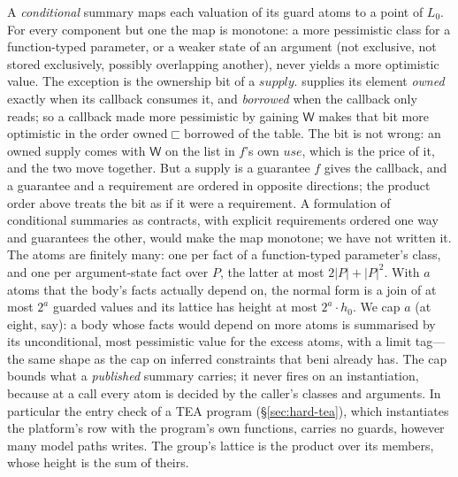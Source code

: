 A \emph{conditional} summary maps each valuation of its guard atoms to a point of $L_0$. For every
component but one the map is monotone: a more pessimistic class for a function-typed parameter, or a
weaker state of an argument (not exclusive, not stored exclusively, possibly overlapping another), never
yields a more optimistic value. The exception is the ownership bit of a $\mathit{supply}$. 
supplies its element \emph{owned} exactly when its callback consumes it, and \emph{borrowed} when the
callback only reads; so a callback made more pessimistic by gaining $\mathsf{W}$ makes that bit more
optimistic in the order $\mathrm{owned} \sqsubset \mathrm{borrowed}$ of the table. The bit is not wrong:
an owned supply comes with $\mathsf{W}$ on the list in $f$'s own $\mathit{use}$, which is the price of it,
and the two move together. But a supply is a guarantee $f$ gives the callback, and a guarantee and a
requirement are ordered in opposite directions; the product order above treats the bit as if it were a
requirement. A formulation of conditional summaries as contracts, with explicit requirements ordered one
way and guarantees the other, would make the map monotone; we have not written it. The atoms are finitely many: one per fact of a function-typed parameter's class, and one per
argument-state fact over $P$, the latter at most $2|P| + |P|^2$. With $a$ atoms that the body's facts
actually depend on, the normal form is a join of at most $2^a$ guarded values and its lattice has height
at most $2^a \cdot h_0$. We cap $a$ (at eight, say): a body whose facts would depend on more atoms is
summarised by its unconditional, most pessimistic value for the excess atoms, with a limit tag---the
same shape as the cap on inferred constraints that beni already has. The cap bounds what a
\emph{published} summary carries; it never fires on an instantiation, because at a call every atom is
decided by the caller's classes and arguments. In particular the entry check of a TEA program
(\S\ref{sec:hard-tea}), which instantiates the platform's row with the program's own functions, carries
no guards, however many model paths  writes. The group's lattice is the product over its
members, whose height is the sum of theirs.

